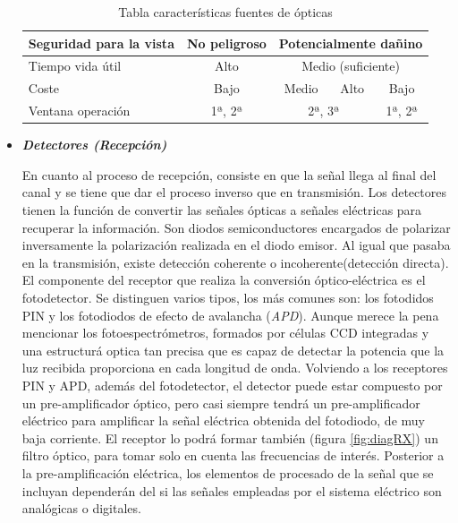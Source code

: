 \begin{itemize}
\begin{table}[H]
\begin{tabular}{l|c|c|c|c|}
  				\multicolumn{1}{|l|}{\cellcolor[HTML]{EFEFEF}Seguridad para la vista}          & No peligroso                         & \multicolumn{3}{c|}{Potencialmente dañino}                                                                                  \\ \hline
  				\multicolumn{1}{|l|}{\cellcolor[HTML]{EFEFEF}Tiempo vida útil}                 & Alto                                 & \multicolumn{3}{c|}{Medio (suficiente)}                                                                                     \\ \hline
  				\multicolumn{1}{|l|}{\cellcolor[HTML]{EFEFEF}Coste}                            & Bajo                                 & Medio                                   & Alto                                     & Bajo                                   \\ \hline
  				\multicolumn{1}{|l|}{\cellcolor[HTML]{EFEFEF}Ventana operación}                & 1ª, 2ª                               & \multicolumn{2}{c|}{2ª, 3ª}                                                        & 1ª, 2ª                                 \\ \hline
  			\end{tabular}
  		\caption{Tabla características fuentes de ópticas}
  		\label{tabla:caractFuentes}
  		\end{table}
  	
 		\item \textit{\textbf{Detectores (Recepción)}}
 			
 		En cuanto al proceso de recepción, consiste en que la señal llega al final del canal y se tiene que dar el proceso inverso que en transmisión. Los detectores tienen la función de convertir las señales ópticas a señales eléctricas para recuperar la información. Son diodos semiconductores encargados de polarizar inversamente la polarización realizada en el diodo emisor.  Al igual que pasaba en la transmisión, existe detección coherente o incoherente(detección directa). El componente del receptor que realiza la conversión óptico-eléctrica es el fotodetector. Se distinguen varios tipos, los más comunes son: los fotodidos PIN y los fotodiodos de efecto de avalancha (\textit{APD}). Aunque merece la pena mencionar los fotoespectrómetros, formados por células CCD integradas y una estructurá optica tan precisa que es capaz de detectar la potencia que la luz recibida proporciona en cada longitud de onda. Volviendo a los receptores PIN y APD, además del fotodetector, el detector puede estar compuesto por un pre-amplificador óptico, pero casi siempre tendrá un pre-amplificador eléctrico para amplificar la señal eléctrica obtenida del fotodiodo, de muy baja corriente. El receptor lo podrá formar también (figura \ref{fig:diagRX}) un filtro óptico, para tomar solo en cuenta las frecuencias de interés. Posterior a la pre-amplificación eléctrica, los elementos de procesado de la señal que se incluyan dependerán del si las señales empleadas por el sistema eléctrico son analógicas o digitales.
 		

\end{itemize}
